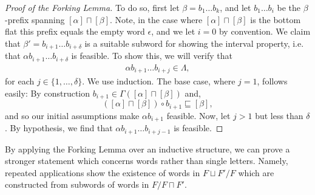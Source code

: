 \documentclass[11pt]{article}
\newcommand{\glang}{\Lambda}
\begin{document}
\begin{proof}[Proof of the Forking Lemma]
    To do so, first let $\beta = b_1\ldots b_k$, and let $b_1 \ldots b_i$ be the $\beta$-prefix spanning $[\alpha]\sqcap [\beta]$.
    Note, in the case where $[\alpha] \sqcap [\beta]$ is the bottom flat this prefix equals the empty word $\epsilon$, and we let $i = 0$ by convention.
    We claim that $\beta' = b_{i+1}\ldots b_{i+\delta}$ is a suitable subword for showing the interval property, i.e. that $\alpha b_{i+1}\ldots b_{i+\delta}$ is feasible.
    To show this, we will verify that
    \begin{align*}
        \alpha b_{i+1} \ldots b_{i+j}\in\glang,
    \end{align*}
    for each $j \in \{1, \ldots, \delta\}$.
    We use induction.
    The base case, where $j = 1$, follows easily:
    By construction $b_{i+1} \in \Gamma([\alpha]\sqcap[\beta])$ and,
    \[
        ([\alpha]\sqcap[\beta])\circ b_{i+1} \sqsubseteq [\beta],
    \]
    and so our initial assumptions make $\alpha b_{i+1}$ feasible.
    Now, let $j > 1$ but less than $\delta$.
    By hypothesis, we find that $\alpha b_{i+1}\ldots b_{i + j - 1}$ is feasible.
\fi
\end{proof}

By applying the Forking Lemma over an inductive structure, we can prove a stronger statement which concerns words rather than single letters.
Namely, repeated applications show the existence of words in $F\sqcup F'/F$ which are constructed from subwords of words in $F/F\sqcap F'$.
\end{document}
